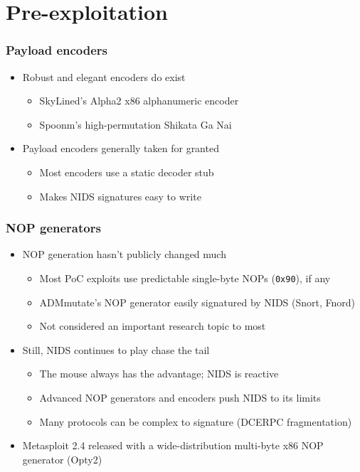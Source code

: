 \documentclass{beamer}
\newenvironment{sitemize}{\vspace{1mm}\begin{itemize}\itemsep 4pt\small}{\end{itemize}}
\begin{document}
\section{Pre-exploitation}
\begin{frame}[t]
    \frametitle{Payload encoders}

    \begin{sitemize}
        \item Robust and elegant encoders do exist
        \begin{sitemize}
            \item SkyLined's Alpha2 x86 alphanumeric encoder
            \item Spoonm's high-permutation Shikata Ga Nai
        \end{sitemize}

        \pause
        \item Payload encoders generally taken for granted
        \begin{sitemize}
            \item Most encoders use a static decoder stub
            \item Makes NIDS signatures easy to write
        \end{sitemize}
    \end{sitemize}
\end{frame}

\begin{frame}[t]
    \frametitle{NOP generators}

    \begin{sitemize}
        \item NOP generation hasn't publicly changed much
        \begin{sitemize}
            \item Most PoC exploits use predictable single-byte NOPs (\texttt{0x90}), if any
            \item ADMmutate's NOP generator easily signatured by NIDS (Snort, Fnord)
            \item Not considered an important research topic to most
        \end{sitemize}

        \pause
        \item Still, NIDS continues to play chase the tail
        \begin{sitemize}
            \item The mouse always has the advantage; NIDS is reactive
            \item Advanced NOP generators and encoders push NIDS to its limits
            \item Many protocols can be complex to signature (DCERPC fragmentation)
        \end{sitemize}

        \pause
        \item Metasploit 2.4 released with a wide-distribution
        multi-byte x86 NOP generator (Opty2)
    \end{sitemize}
\end{frame}
\end{document}
